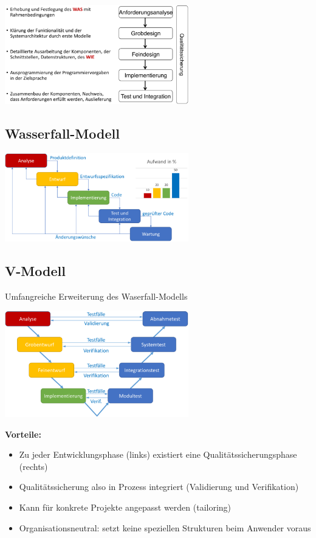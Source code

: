 \documentclass[11pt, a4paper]{article}
\begin{document}
\vspace{2em}

\centering \includegraphics[width=0.6\textwidth]{Vorgehen-00.png} 

\raggedright


\subsection{Wasserfall-Modell}

\centering \includegraphics[width=0.6\textwidth]{Vorgehen-01.png} 

\raggedright

\newpage

\subsection{V-Modell}

Umfangreiche Erweiterung des Waserfall-Modells

\vspace{1em}

\centering \includegraphics[width=0.6\textwidth]{Vorgehen-02.png} 

\raggedright

\textbf{Vorteile:}
\begin{itemize}
    \item Zu jeder Entwicklungsphase (links) existiert eine Qualitätssicherungsphase (rechts)
    \item Qualitätssicherung also in Prozess integriert (Validierung und Verifikation)
    \item Kann für konkrete Projekte angepasst werden (tailoring)
    \item Organisationsneutral: setzt keine speziellen Strukturen beim Anwender voraus
\end{itemize}
\end{document}
